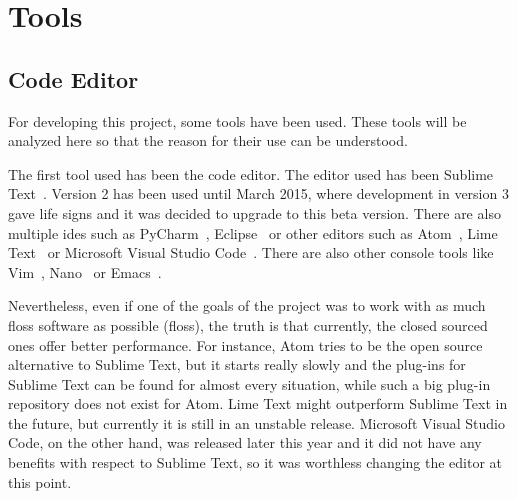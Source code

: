 \section{Tools}

\subsection{Code Editor}

For developing this project, some tools have been used. These tools will be analyzed here so that
the reason for their use can be understood.

The first tool used has been the code editor. The editor used has been Sublime
Text~\cite{sublime_web}. Version 2 has been used until March 2015, where development in version 3
gave life signs and it was decided to upgrade to this beta version. There are also multiple
\acrshort{ide}s such as PyCharm~\cite{pycharm_web}, Eclipse~\cite{eclipse_web} or other editors such
as Atom~\cite{atom_web}, Lime Text~\cite{lime_web} or Microsoft Visual Studio
Code~\cite{ms_code_web}. There are also other console tools like Vim~\cite{vim_web},
Nano~\cite{nano_web} or Emacs~\cite{emacs_web}.

Nevertheless, even if one of the goals of the project was to work with as much \acrshort{floss}
software as possible (\acrlong{floss}), the truth is that currently, the closed sourced ones offer
better performance. For instance, Atom tries to be the open source alternative to Sublime Text, but
it starts really slowly and the plug-ins for Sublime Text can be found for almost every situation,
while such a big plug-in repository does not exist for Atom. Lime Text might outperform Sublime Text
in the future, but currently it is still in an unstable release. Microsoft Visual Studio Code, on
the other hand, was released later this year and it did not have any benefits with respect to
Sublime Text, so it was worthless changing the editor at this point.

